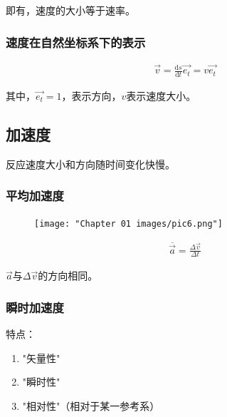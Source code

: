 \documentclass[
	12pt, %
	a4paper, %
]{myLegrandOrangeBook}
\newcommand{\rmd}{\mathrm{d}}
\begin{document}
    即有，速度的大小等于速率。

\subsubsection*{速度在自然坐标系下的表示}

    \begin{align}
        \overrightarrow{v} = \frac{\rmd s}{\rmd t}\overrightarrow{e_{t}}
        = v \overrightarrow{e_{t}}
    \end{align}

    其中，\(\overrightarrow{e_{t}} = 1\)，表示方向，\(v\)表示速度大小。

\subsection{加速度}

    反应速度大小和方向随时间变化快慢。

\subsubsection*{平均加速度}

    \begin{figure}[!htbp]
        \centering
        \texttt{[image: "Chapter 01 images/pic6.png"]}
        \label{pic6}
    \end{figure}

    \vspace{1em}
    \begin{definition}[平均加速度]

        \begin{align}
            \overline{\overrightarrow{a}} = \frac{\Delta \overrightarrow{v}}{\Delta t}
        \end{align}

        \(\overrightarrow{a}\)与\(\Delta \overrightarrow{v}\)的方向相同。
    \end{definition}

\subsubsection*{瞬时加速度}

    特点：

    \begin{enumerate}
        \item {\color{SkyBlue}"矢量性"}
        \item {\color{SkyBlue}"瞬时性"}
        \item {\color{SkyBlue}"相对性"}（相对于某一参考系）
    \end{enumerate}
\end{document}
